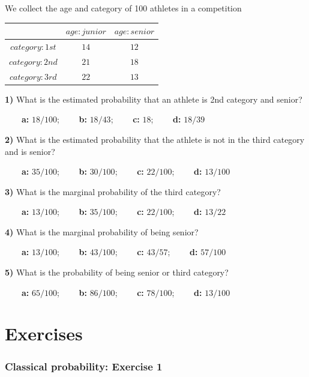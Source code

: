 \documentclass[
]{book}
\begin{document}
We collect the age and category of 100 athletes in a competition

\begin{longtable}[]{@{}ccc@{}}
\toprule\noalign{}
& \(age:junior\) & \(age:senior\) \\
\midrule\noalign{}
\endhead
\bottomrule\noalign{}
\endlastfoot
\(category:1st\) & \(14\) & \(12\) \\
\(category:2nd\) & \(21\) & \(18\) \\
\(category:3rd\) & \(22\) & \(13\) \\
\end{longtable}

\textbf{1)} What is the estimated probability that an athlete is 2nd category and senior?

\textbf{\(\qquad\)a:} \(18/100\); \textbf{\(\qquad\)b:} \(18/43\); \textbf{\(\qquad\)c:} \(18\); \textbf{\(\qquad\)d:} \(18/39\)

\textbf{2)} What is the estimated probability that the athlete is not in the third category and is senior?

\textbf{\(\qquad\)a:} \(35/100\); \textbf{\(\qquad\)b:} \(30/100\); \textbf{\(\qquad\)c:} \(22/100\); \textbf{\(\qquad\)d:} \(13/100\)

\textbf{3)} What is the marginal probability of the third category?

\textbf{\(\qquad\)a:} \(13/100\); \textbf{\(\qquad\)b:} \(35/100\); \textbf{\(\qquad\)c:} \(22/100\); \textbf{\(\qquad\)d:} \(13/22\)

\textbf{4)} What is the marginal probability of being senior?

\textbf{\(\qquad\)a:} \(13/100\); \textbf{\(\qquad\)b:} \(43/100\); \textbf{\(\qquad\)c:} \(43/57\); \textbf{\(\qquad\)d:} \(57/100\)

\textbf{5)} What is the probability of being senior or third category?

\textbf{\(\qquad\)a:} \(65/100\); \textbf{\(\qquad\)b:} \(86/100\); \textbf{\(\qquad\)c:} \(78/100\); \textbf{\(\qquad\)d:} \(13/100\)

\hypertarget{exercises-1}{%
\section{Exercises}\label{exercises-1}}

\hypertarget{classical-probability-exercise-1}{%
\subsubsection{Classical probability: Exercise 1}\label{classical-probability-exercise-1}}
\end{document}
